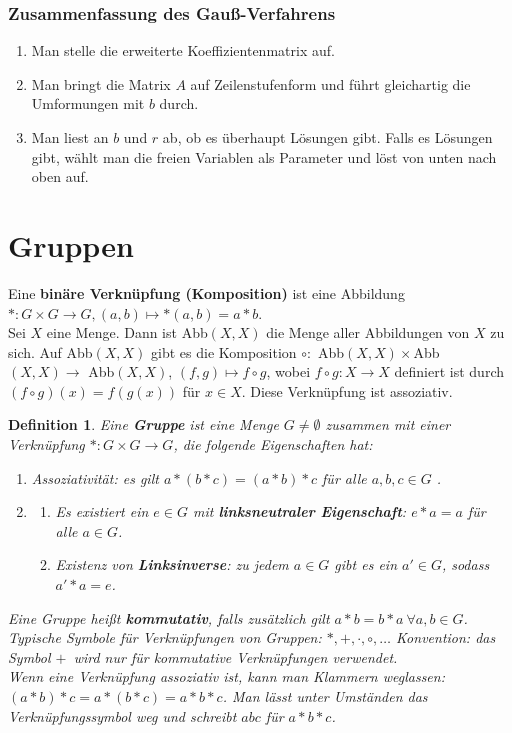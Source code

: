 \documentclass[12pt,a4paper]{article}
\theoremstyle{plain}
\newtheorem{Definition}[Theorem]{Definition}
\newcommand{\herv}[1]{{\emph{\textbf{#1}}}}
\numberwithin{equation}{section}
\begin{document}
\subsubsection{Zusammenfassung des Gauß-Verfahrens}
\begin{enumerate}
\item Man stelle die erweiterte Koeffizientenmatrix auf.
\item Man bringt die Matrix $A$ auf Zeilenstufenform und führt gleichartig die Umformungen mit $b$ durch.
\item Man liest an $b$ und $r$ ab, ob es überhaupt Lösungen gibt. Falls es Lösungen gibt, wählt man die freien Variablen als Parameter und löst von unten nach oben auf.
\end{enumerate}
\section{Gruppen}
Eine \textbf{binäre Verknüpfung (Komposition)} ist eine Abbildung $*:G\times G \rightarrow G, (a,b)\mapsto *(a,b)=a*b$.\\
Sei $X$ eine Menge. Dann ist Abb$(X,X)$ die Menge aller Abbildungen von $X$ zu sich. Auf Abb$(X,X)$ gibt es die Komposition $\circ:$ Abb$(X,X)\times$Abb$(X,X) \rightarrow $ Abb$(X,X)$, $(f,g)\mapsto f\circ g$, wobei $f\circ g: X\rightarrow X$ definiert ist durch $(f\circ g)(x)=f(g(x))$ für $x\in X$. Diese Verknüpfung ist assoziativ.
\begin{Definition}
Eine \herv{Gruppe} ist eine Menge $G\neq \emptyset$ zusammen mit einer Verknüpfung $*:G\times G \rightarrow G$, die folgende Eigenschaften hat:
\begin{enumerate}
\renewcommand{\labelenumi}{\emph{\underline{G\arabic{enumi}}}}
\item Assoziativität: es gilt $a*(b*c)=(a*b)*c$ für alle $a,b,c\in G$ .
\item \begin{enumerate} \renewcommand{\labelenumi}{\emph{(\alph{enumi})}}
\item Es existiert ein $e\in G$ mit \herv{linksneutraler Eigenschaft}: $e*a=a$ für alle $a\in G$.
\item Existenz von \herv{Linksinverse}: zu jedem $a\in G$ gibt es ein $a'\in G$, sodass $a'*a=e$.
\end{enumerate}
\end{enumerate}
Eine Gruppe heißt \herv{kommutativ}, falls zusätzlich gilt $a*b=b*a\ \forall a,b\in G$. Typische Symbole für Verknüpfungen von Gruppen: $*,+,\cdot,\circ,\ldots$ Konvention: das Symbol \glqq$+$\grqq\ wird nur für kommutative Verknüpfungen verwendet. \\
Wenn eine Verknüpfung assoziativ ist, kann man Klammern weglassen: $(a*b)*c=a*(b*c)=a*b*c$. Man lässt unter Umständen das Verknüpfungssymbol weg und schreibt $abc$ für $a*b*c$.
\end{Definition}
\end{document}
